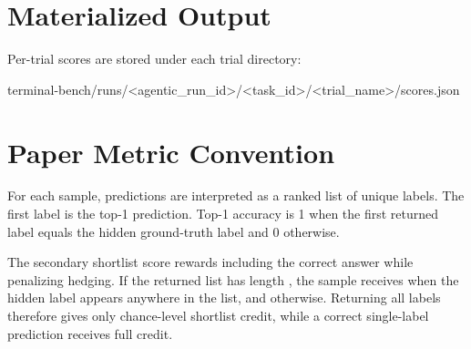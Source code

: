 \documentclass[11pt]{article}
\begin{document}
\section*{Materialized Output}
Per-trial scores are stored under each trial directory:
\begin{DocCode}
terminal-bench/runs/<agentic_run_id>/<task_id>/<trial_name>/scores.json
\end{DocCode}

\section*{Paper Metric Convention}
For each sample, predictions are interpreted as a ranked list of unique labels.
The first label is the top-1 prediction.
Top-1 accuracy is 1 when the first returned label equals the hidden ground-truth label and 0 otherwise.

The secondary shortlist score rewards including the correct answer while penalizing hedging.
If the returned list has length , the sample receives  when the hidden label appears anywhere in the list, and  otherwise.
Returning all labels therefore gives only chance-level shortlist credit, while a correct single-label prediction receives full credit.
\end{document}

